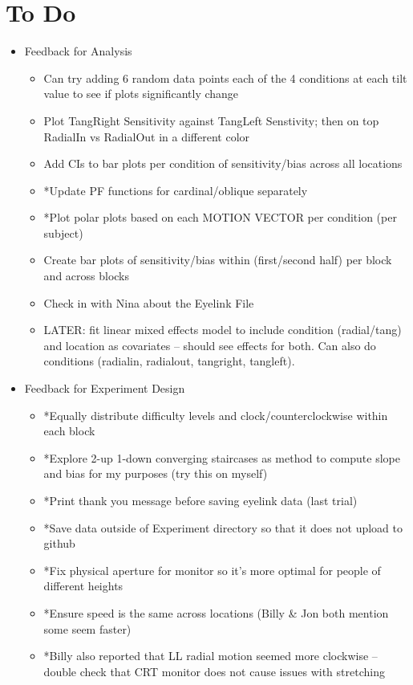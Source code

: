 \documentclass[11pt]{article} %
\begin{document}
\section{To Do} 
\begin{itemize}
\item Feedback for Analysis
	\begin{itemize}
	\item Can try adding 6 random data points each of the 4 conditions at each tilt value to see if plots significantly change
	\item Plot TangRight Sensitivity against TangLeft Senstivity; then on top RadialIn vs RadialOut in a different color
	\item Add CIs to bar plots per condition of sensitivity/bias across all locations
	\item *Update PF functions for cardinal/oblique separately
	\item *Plot polar plots based on each MOTION VECTOR per condition (per subject)
	\item Create bar plots of sensitivity/bias within (first/second half) per block and across blocks
	\item Check in with Nina about the Eyelink File
	\item LATER: fit linear mixed effects model to include condition (radial/tang) and location as covariates -- should see effects for both. Can also do conditions (radialin, radialout, tangright, tangleft).
	\end{itemize}
\item Feedback for Experiment Design
	\begin{itemize}
	\item *Equally distribute difficulty levels and clock/counterclockwise within each block
	\item *Explore 2-up 1-down converging staircases as method to compute slope and bias for my purposes (try this on myself)
	\item *Print thank you message before saving eyelink data (last trial)
	\item *Save data outside of Experiment directory so that it does not upload to github
	\item *Fix physical aperture for monitor so it's more optimal for people of different heights
	\item *Ensure speed is the same across locations (Billy \& Jon both mention some seem faster)
	\item *Billy also reported that LL radial motion seemed more clockwise -- double check that CRT monitor does not cause issues with stretching

\end{itemize}
\end{itemize}
\end{document}
